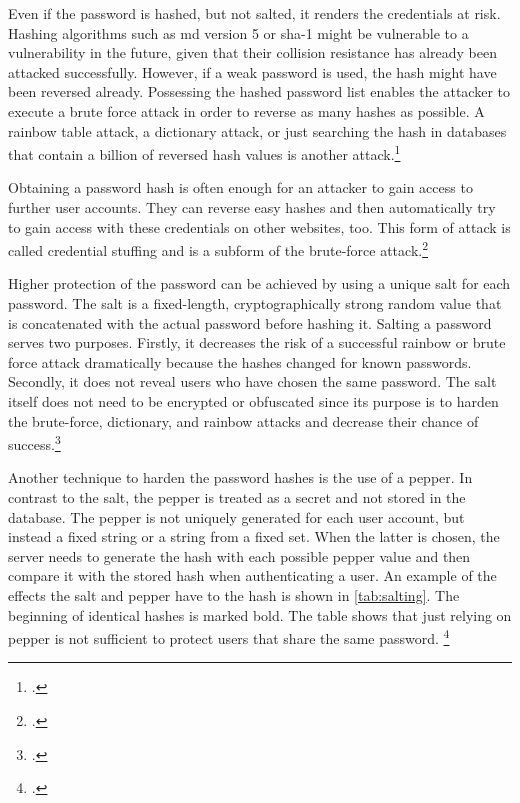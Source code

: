 Even if the password is hashed, but not salted, it renders the credentials at risk. Hashing algorithms such as \gls{md} version 5 or \gls{sha}-1 might be vulnerable to a vulnerability in the future, given that their collision resistance has already been attacked successfully. However, if a weak password is used, the hash might have been reversed already. Possessing the hashed password list enables the attacker to execute a brute force attack in order to reverse as many hashes as possible. A rainbow table attack, a dictionary attack, or just searching the hash in databases that contain a billion of reversed hash values is another attack.\footcites[See][1425]{Thomas:2017:DBP:3133956.3134067}[See][427--430]{doi:10.1002/9781118256107.ch37}[See][56--57]{anderson2008security}

Obtaining a password hash is often enough for an attacker to gain access to further user accounts. They can reverse easy hashes and then automatically try to gain access with these credentials on other websites, too. This form of attack is called \frqq credential stuffing\flqq{} and is a subform of the brute-force attack.\footcites[See][]{troy-hunt-1}[See][1565]{48399}[See][Chapter 5.5]{zabicki2019practical}

Higher protection of the password can be achieved by using a unique \frqq salt\flqq{} for each password. The salt is a fixed-length, cryptographically strong random value that is concatenated with the actual password before hashing it. Salting a password serves two purposes. Firstly, it decreases the risk of a successful rainbow or brute force attack dramatically because the hashes changed for known passwords. Secondly, it does not reveal users who have chosen the same password. The salt itself does not need to be encrypted or obfuscated since its purpose is to harden the brute-force, dictionary, and rainbow attacks and decrease their chance of success.\footcites[See][32--34]{IdentityandDataSecurityforWebDevelopment}[See][130--131]{brotherston2017defensive}[See][15]{SP80063B}

Another technique to harden the password hashes is the use of a \frqq pepper\flqq{}. In contrast to the salt, the pepper is treated as a secret and not stored in the database. The pepper is not uniquely generated for each user account, but instead a fixed string or a string from a fixed set. When the latter is chosen, the server needs to generate the hash with each possible pepper value and then compare it with the stored hash when authenticating a user. An example of the effects the salt and pepper have to the hash is shown in \autoref{tab:salting}. The beginning of identical hashes is marked bold. The table shows that just relying on pepper is not sufficient to protect users that share the same password. \footcites[See][33--35]{IdentityandDataSecurityforWebDevelopment}[See][15]{SP80063B}[See][173]{MANBER1996171}

